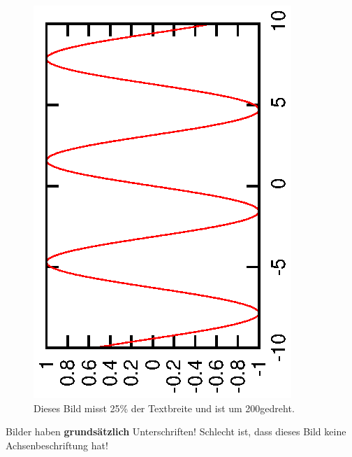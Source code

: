 \begin{figure}[bh]
 \centering
 \includegraphics[angle=255, width=0.25\linewidth]{sinus}
  \caption{Dieses Bild misst 25\%  der Textbreite und ist um 200\textdegree gedreht.}
 \label{fig:sinus2}
\end{figure}
Bilder haben \textbf{grundsätzlich} Unterschriften!
Schlecht ist, dass dieses Bild keine Achsenbeschriftung hat!